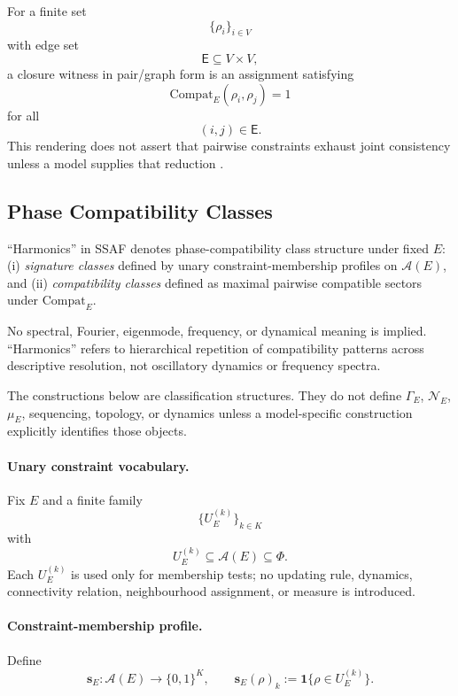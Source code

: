 \documentclass[aps,prx,onecolumn,11pt]{revtex4-2}
\theoremstyle{plain}
\theoremstyle{definition}
\theoremstyle{remark}
\begin{document}
For a finite set
\[
\{\rho_i\}_{i\in V}
\]
with edge set
\[
\mathsf{E}\subseteq V\times V,
\]
a closure witness in pair/graph form is an assignment satisfying
\[
\mathrm{Compat}_E(\rho_i,\rho_j)=1
\]
for all
\[
(i,j)\in\mathsf{E}.
\]
This rendering does not assert that pairwise constraints exhaust joint
consistency unless a model supplies that reduction
\cite{Dechter2003}.

\subsection{Phase Compatibility Classes}
\label{subsec:phase_harmonics_ordering_struct}

``Harmonics'' in SSAF denotes phase-compatibility class structure under
fixed \(E\): (i) \emph{signature classes} defined by unary
constraint-membership profiles on \(\mathcal{A}(E)\), and (ii)
\emph{compatibility classes} defined as maximal pairwise compatible
sectors under \(\mathrm{Compat}_E\).

No spectral, Fourier, eigenmode, frequency, or dynamical meaning is
implied. ``Harmonics'' refers to hierarchical repetition of
compatibility patterns across descriptive resolution, not oscillatory
dynamics or frequency spectra.

The constructions below are classification structures. They do not
define \(\Gamma_E\), \(\mathcal N_E\), \(\mu_E\), sequencing, topology,
or dynamics unless a model-specific construction explicitly identifies
those objects.

\paragraph{Unary constraint vocabulary.}

Fix \(E\) and a finite family
\[
\{U^{(k)}_E\}_{k\in K}
\]
with
\[
U^{(k)}_E\subseteq\mathcal{A}(E)\subseteq\Phi.
\]
Each \(U^{(k)}_E\) is used only for membership tests; no updating rule,
dynamics, connectivity relation, neighbourhood assignment, or measure is
introduced.

\paragraph{Constraint-membership profile.}

Define
\begin{equation}
\mathbf{s}_E :
\mathcal{A}(E)
\to
\{0,1\}^K,
\qquad
\mathbf{s}_E(\rho)_k
:=
\mathbf{1}\{\rho\in U^{(k)}_E\}.
\label{eq:constraint_profile_map_struct}
\end{equation}
\end{document}
